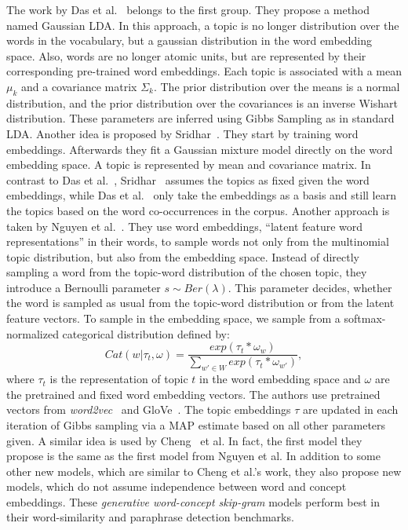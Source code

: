 \documentclass{sig-alternate-05-2015}
\begin{document}
The work by Das et al.~\cite{Das2015} belongs to the first group. They propose a method named Gaussian LDA.
In this approach, a topic is no longer distribution over the words in the vocabulary, but a gaussian distribution in the word embedding space.
Also, words are no longer atomic units, but are represented by their corresponding pre-trained word embeddings.
Each topic is associated with a mean $\mu_k$ and a covariance matrix $\Sigma_k$.
The prior distribution over the means is a normal distribution, and the prior distribution over the covariances is an inverse Wishart distribution.
These parameters are inferred using Gibbs Sampling as in standard LDA. %
Another idea is proposed by Sridhar~\cite{Sridhar2015}.
They start by training word embeddings.
Afterwards they fit a Gaussian mixture model directly on the word embedding space.
A topic is represented by mean and covariance matrix.
In contrast to Das et al.~\cite{Das2015}, Sridhar~\cite{Sridhar2015} assumes the topics as fixed given the word embeddings, while Das et al.~\cite{Das2015} only take the embeddings as a basis and still learn the topics based on the word co-occurrences in the corpus.
Another approach is taken by Nguyen et al.~\cite{Nguyen2015}.
They use word embeddings, ``latent feature word representations'' in their words, to sample words not only from the multinomial topic distribution, but also from the embedding space.
Instead of directly sampling a word from the topic-word distribution of the chosen topic, they introduce a Bernoulli parameter $s \sim Ber(\lambda)$.
This parameter decides, whether the word is sampled as usual from the topic-word distribution or from the latent feature vectors.
To sample in the embedding space, we sample from a softmax-normalized categorical distribution defined by:
\begin{equation*}
       Cat(w | \tau_t, \omega) = \frac{exp(\tau_t * \omega_w)}{\sum_{w' \in W} exp(\tau_t * \omega_{w'})},
\end{equation*}
where $\tau_t$ is the representation of topic $t$ in the word embedding space and $\omega$ are the pretrained and fixed word embedding vectors.
The authors use pretrained vectors from \emph{word2vec}~\cite{Mikolov2013a} and GloVe~\cite{Pennington2014}.
The topic embeddings $\tau$ are updated in each iteration of Gibbs sampling via a MAP estimate based on all other parameters given.
A similar idea is used by Cheng~\cite{Cheng2015} et al.
In fact, the first model they propose is the same as the first model from Nguyen et al.
In addition to some other new models, which are similar to Cheng et al.'s work, they also propose new models, which do not assume independence between word and concept embeddings.
These \emph{generative word-concept skip-gram} models perform best in their word-similarity and paraphrase detection benchmarks.
\end{document}

